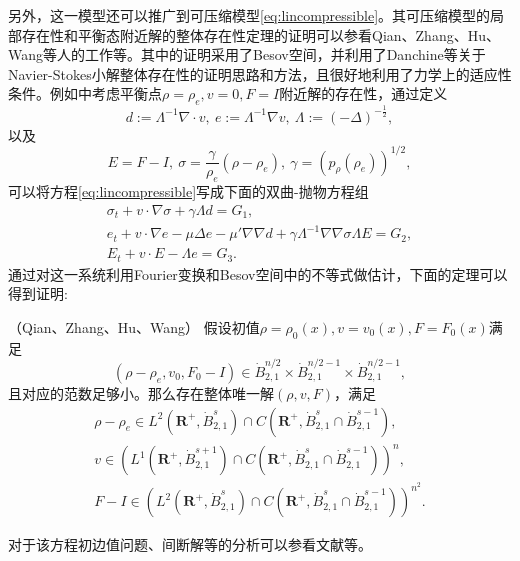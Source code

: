 另外，这一模型还可以推广到可压缩模型\eqref{eq:lincompressible}。其可压缩模型的局部存在性和平衡态附近解的整体存在性定理的证明可以参看Qian、Zhang、Hu、Wang等人的工作\cite{qian2010global,hu2011global,hu2012strong}等。其中的证明采用了Besov空间，并利用了Danchine等关于Navier-Stokes小解整体存在性的证明思路和方法\cite{danchin2000global}，且很好地利用了力学上的适应性条件。例如\cite{qian2010global}中考虑平衡点$\rho=\rho_e,v=0,F=I$附近解的存在性，通过定义
\begin{equation*}
	d:=\Lambda^{-1} \nabla \cdot v, \ e:= \Lambda^{-1} \nabla v, \ \Lambda :=(-\Delta)^{-\frac{1}{2}},
\end{equation*}
以及
\begin{equation*}
	E=F-I, \ \sigma = \frac{\gamma}{\rho_e} (\rho - \rho_e), \ \gamma = (p_{\rho}(\rho_e))^{1/2},
\end{equation*}
可以将方程\eqref{eq:lincompressible}写成下面的双曲-抛物方程组
\begin{eqnarray*}
	\sigma_t + v \cdot \nabla \sigma + \gamma \Lambda d = G_1, \\
	e_t + v \cdot \nabla e - \mu \Delta e - \mu' \nabla \nabla d + \gamma \Lambda^{-1} \nabla \nabla \sigma \Lambda E = G_2, \\
	E_t + v \cdot E - \Lambda e = G_3.
\end{eqnarray*}
通过对这一系统利用Fourier变换和Besov空间中的不等式做估计，下面的定理可以得到证明:
\begin{theorem}（Qian、Zhang\cite{qian2010global}、Hu、Wang\cite{hu2011global}）
	假设初值$\rho=\rho_0(x),v=v_0(x),F=F_0(x)$满足
	\begin{equation*}
		(\rho - \rho_e,v_0,F_0-I) \in \dot{B}_{2,1}^{n/2} \times \dot{B}_{2,1}^{n/2-1} \times \dot{B}_{2,1}^{n/2-1},
	\end{equation*}
	且对应的范数足够小。那么存在整体唯一解$(\rho,v,F)$，满足
	\begin{eqnarray*}
		\rho - \rho_e \in L^2(\mathbf{R}^+,\dot{B}_{2,1}^s) \cap C(\mathbf{R}^+,\dot{B}_{2,1}^s\cap \dot{B}_{2,1}^{s-1}),\\
		v \in \left( L^1(\mathbf{R}^+,\dot{B}_{2,1}^{s+1}) \cap C(\mathbf{R}^+,\dot{B}_{2,1}^s \cap \dot{B}_{2,1}^{s-1}) \right)^n, \\
		F- I \in \left( L^2(\mathbf{R}^+,\dot{B}_{2,1}^s) \cap C(\mathbf{R}^+,\dot{B}_{2,1}^s \cap \dot{B}_{2,1}^{s-1}) \right)^{n^2}.
	\end{eqnarray*}
\end{theorem}

对于该方程初边值问题、间断解等的分析可以参看文献\cite{qian2011initial,lin2008initial,lei2010remarks,hu2012formation,hu2015global}等。

